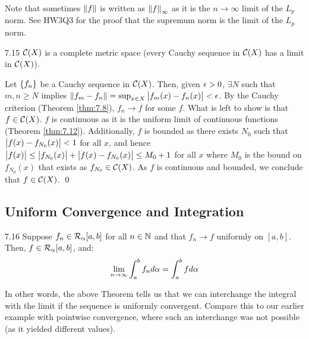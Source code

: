 \noindent Note that sometimes $\norm{f}$ is written as $\norm{f}_\infty$ as it is the $n \rightarrow \infty$ limit of the $L_p$ norm. See HW3Q3 for the proof that the supremum norm is the limit of the $L_p$ norm. 

\begin{theorem}{}{7.15}
    $\mathcal{C}(X)$ is a complete metric space (every Cauchy sequence in $\mathcal{C}(X)$ has a limit in $\mathcal{C}(X)$).
\end{theorem}
\begin{nproof}
    Let $\set{f_n}$ be a Cauchy sequence in $\mathcal{C}(X)$. Then, given $\epsilon > 0$, $\exists N$ such that $m, n \geq N$ implies $\norm{f_m - f_n} = \sup_{x \in X}\abs{f_m(x) - f_n(x)} < \epsilon$. By the Cauchy criterion (Theorem \ref{thm:7.8}), $f_n \rightarrow f$ for some $f$. What is left to show is that $f \in \mathcal{C}(X)$. $f$ is continuous as it is the uniform limit of continuous functions (Theorem \ref{thm:7.12}). Additionally, $f$ is bounded as there exists $N_0$ such that $\abs{f(x) - f_{N_{0}}(x)} < 1$ for all $x$, and hence $\abs{f(x)} \leq \abs{f_{N_0}(x)} + \abs{f(x) - f_{N_0}(x)} \leq M_0 + 1$ for all $x$ where $M_0$ is the bound on $f_{N_0}(x)$ that exists as $f_{N_0} \in \mathcal{C}(X)$. As $f$ is continuous and bounded, we conclude that $f \in \mathcal{C}(X)$. \qed
\end{nproof}

\subsection{Uniform Convergence and Integration}
\begin{theorem}{}{7.16}
    Suppose $f_n \in \mathcal{R}_{\alpha}[a, b]$ for all $n \in \mathbb{N}$ and that $f_n \rightarrow f$ uniformly on $[a, b]$. Then, $f \in \mathcal{R}_{\alpha}[a, b]$, and:
    \begin{align*}
        \lim_{n \rightarrow \infty} \int_{a}^b f_n d\alpha = \int_a^b f d\alpha
    \end{align*}
\end{theorem}

\newpage
\noindent In other words, the above Theorem tells us that we can interchange the integral with the limit if the sequence is uniformly convergent. Compare this to our earlier example with pointwise convergence, where such an interchange was not possible (as it yielded different values).

